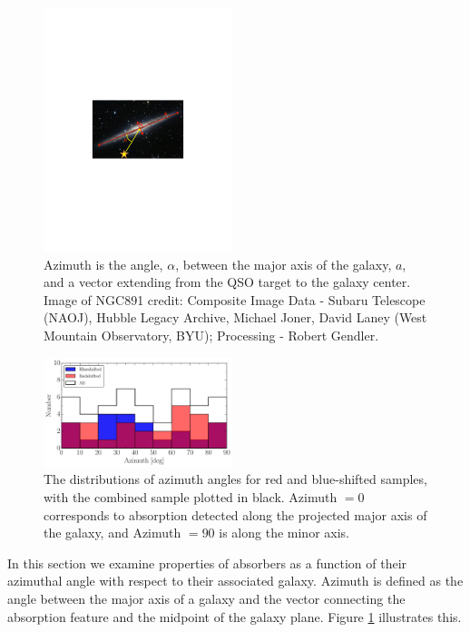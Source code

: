 \documentclass[twocolumn,tighten]{aastex6}
\begin{document}
\begin{figure}[t!]
        \centering
        \includegraphics[width=0.49\textwidth]{fig11.pdf}
        \caption{\small{Azimuth is the angle, $\alpha$, between the major axis of the galaxy, $a$, and a vector extending from the QSO target to the galaxy center. Image of NGC891 credit: Composite Image Data - Subaru Telescope (NAOJ), Hubble Legacy Archive, Michael Joner, David Laney (West Mountain Observatory, BYU); Processing - Robert Gendler.}}
        \label{azimuth_illustration}
        \vspace{5pt}
\end{figure} 

\begin{figure}[t!]
        \centering
        \includegraphics[width=0.49\textwidth]{fig12.pdf}
        \caption{\small{The distributions of azimuth angles for red and blue-shifted samples, with the combined sample plotted in black. Azimuth $= 0$ corresponds to absorption detected along the projected major axis of the galaxy, and Azimuth $= 90$ is along the minor axis.}}
        \label{azimuth_dist}
\end{figure}

In this section we examine properties of absorbers as a function of their azimuthal angle with respect to their associated galaxy. Azimuth is defined as the angle between the major axis of a galaxy and the vector connecting the absorption feature and the midpoint of the galaxy plane. Figure \ref{azimuth_illustration} illustrates this. 
\end{document}
